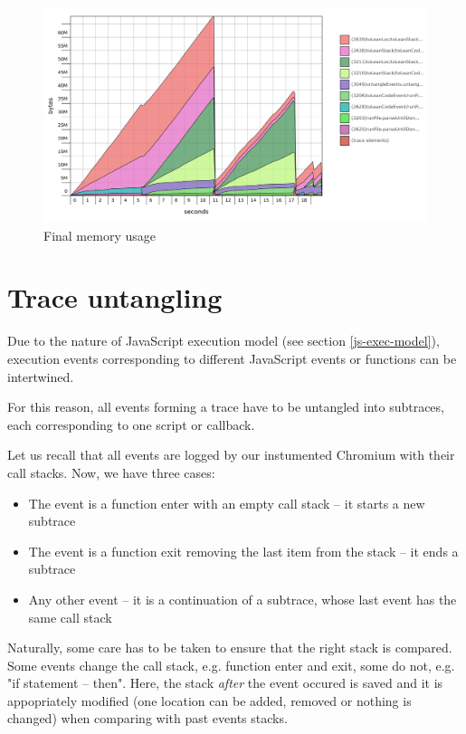 \begin{figure}[hbt!]
 \centering
 \includegraphics[width=\textwidth]{png/strings-map}
 \caption{Final memory usage}
 \label{fig:strings-map}
\end{figure}


\section{Trace untangling}
Due to the nature of JavaScript execution model (see section \ref{js-exec-model}), execution events
corresponding to different JavaScript events or functions can be intertwined.

For this reason, all events forming a trace have to be untangled into subtraces, each corresponding
to one script or callback. 

Let us recall that all events are logged by our instumented Chromium with their call stacks.
Now, we have three cases:
\begin{itemize}
  \item The event is a function enter with an empty call stack -- it starts a new subtrace
  \item The event is a function exit removing the last item from the stack -- it ends a subtrace
  \item Any other event -- it is a continuation of a subtrace, whose last event has the same call stack
\end{itemize}

Naturally, some care has to be taken to ensure that the right stack is compared. Some events change the
call stack, e.g. function enter and exit, some do not, e.g. "if statement -- then".
Here, the stack \emph{after} the event occured is saved and it is appopriately modified 
(one location can be added, removed or nothing is changed) when comparing
with past events stacks.

